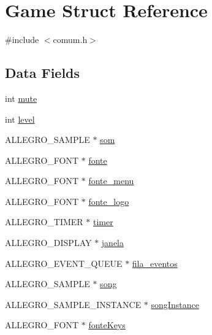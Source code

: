 \hypertarget{struct_game}{\section{Game Struct Reference}
\label{struct_game}
}


{\ttfamily \#include $<$comum.\-h$>$}

\subsection*{Data Fields}
\begin{DoxyCompactItemize}
\item 
int \hyperlink{struct_game_a29128ae5c15a12dea5fe4f263ba6cec1}{mute}
\item 
int \hyperlink{struct_game_acf4d33ee4cff36f69b924471174dcb11}{level}
\item 
A\-L\-L\-E\-G\-R\-O\-\_\-\-S\-A\-M\-P\-L\-E $\ast$ \hyperlink{struct_game_a04a3905df1163c9f0f1572bb4bf44385}{som}
\item 
A\-L\-L\-E\-G\-R\-O\-\_\-\-F\-O\-N\-T $\ast$ \hyperlink{struct_game_aca3355f860197722c1d4c2ad26601dfd}{fonte}
\item 
A\-L\-L\-E\-G\-R\-O\-\_\-\-F\-O\-N\-T $\ast$ \hyperlink{struct_game_af6bd9fcd9fb4f2cfba0ce6b10d9536fc}{fonte\-\_\-menu}
\item 
A\-L\-L\-E\-G\-R\-O\-\_\-\-F\-O\-N\-T $\ast$ \hyperlink{struct_game_a9d57b510f157087d12e1c47586d2cfce}{fonte\-\_\-logo}
\item 
A\-L\-L\-E\-G\-R\-O\-\_\-\-T\-I\-M\-E\-R $\ast$ \hyperlink{struct_game_a5a56835e8f246f98761fb994723020cb}{timer}
\item 
A\-L\-L\-E\-G\-R\-O\-\_\-\-D\-I\-S\-P\-L\-A\-Y $\ast$ \hyperlink{struct_game_ab05780cb7c970d487cfa4eaeb3b583d2}{janela}
\item 
A\-L\-L\-E\-G\-R\-O\-\_\-\-E\-V\-E\-N\-T\-\_\-\-Q\-U\-E\-U\-E $\ast$ \hyperlink{struct_game_a1d4a163479efecd3c6aea8236b72ef13}{fila\-\_\-eventos}
\item 
A\-L\-L\-E\-G\-R\-O\-\_\-\-S\-A\-M\-P\-L\-E $\ast$ \hyperlink{struct_game_ade5ece41d11b17eb4b972f2bf0f6910b}{song}
\item 
A\-L\-L\-E\-G\-R\-O\-\_\-\-S\-A\-M\-P\-L\-E\-\_\-\-I\-N\-S\-T\-A\-N\-C\-E $\ast$ \hyperlink{struct_game_ae572dbdea486bf303ed756e2a1f30e0b}{song\-Instance}
\item 
A\-L\-L\-E\-G\-R\-O\-\_\-\-F\-O\-N\-T $\ast$ \hyperlink{struct_game_a33606e6edba2c6b798d0c70df15eb89f}{fonte\-Keys}
\end{DoxyCompactItemize}


